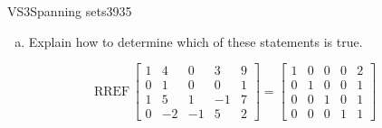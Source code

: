 \begin{exercise}{VS3}{Spanning sets}{3935}
\begin{exerciseStatement}
\begin{enumerate}[(a)]
\begin{itemize}
 The set of vectors \(\left\{ \left[\begin{array}{c}
1 \\
0 \\
1 \\
0
\end{array}\right] , \left[\begin{array}{c}
4 \\
1 \\
5 \\
-2
\end{array}\right] , \left[\begin{array}{c}
0 \\
0 \\
1 \\
-1
\end{array}\right] , \left[\begin{array}{c}
3 \\
0 \\
-1 \\
5
\end{array}\right] , \left[\begin{array}{c}
9 \\
1 \\
7 \\
2
\end{array}\right] \right\}\) does \textbf{not} span \(\mathbb R^4\). 

 
\end{itemize}

     
\item  

 Explain how to determine which of these statements is true. 

 
\end{enumerate}

     \end{exerciseStatement}
 \begin{exerciseAnswer} 

 \[
\mathrm{RREF}\, \left[\begin{array}{ccccc}
1 & 4 & 0 & 3 & 9 \\
0 & 1 & 0 & 0 & 1 \\
1 & 5 & 1 & -1 & 7 \\
0 & -2 & -1 & 5 & 2
\end{array}\right] = \left[\begin{array}{ccccc}
1 & 0 & 0 & 0 & 2 \\
0 & 1 & 0 & 0 & 1 \\
0 & 0 & 1 & 0 & 1 \\
0 & 0 & 0 & 1 & 1
\end{array}\right]
            \] 


\end{exerciseAnswer}
\end{exercise}
